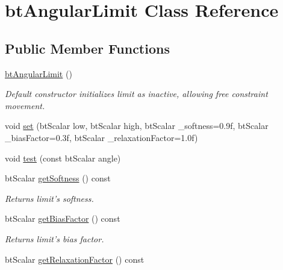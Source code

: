 \hypertarget{classbt_angular_limit}{\section{bt\+Angular\+Limit Class Reference}
\label{classbt_angular_limit}
}
\subsection*{Public Member Functions}
\begin{DoxyCompactItemize}
\item 
\hypertarget{classbt_angular_limit_ac3364359851713e6cb32b16611e9331d}{\hyperlink{classbt_angular_limit_ac3364359851713e6cb32b16611e9331d}{bt\+Angular\+Limit} ()}\label{classbt_angular_limit_ac3364359851713e6cb32b16611e9331d}

\begin{DoxyCompactList}\small\item\em Default constructor initializes limit as inactive, allowing free constraint movement. \end{DoxyCompactList}\item 
void \hyperlink{classbt_angular_limit_aae9e0c21886c2f98f9ad1928bf024b3f}{set} (bt\+Scalar low, bt\+Scalar high, bt\+Scalar \+\_\+softness=0.\+9f, bt\+Scalar \+\_\+bias\+Factor=0.\+3f, bt\+Scalar \+\_\+relaxation\+Factor=1.\+0f)
\item 
void \hyperlink{classbt_angular_limit_aa8908e320fa18257118bbe81948142d8}{test} (const bt\+Scalar angle)
\item 
\hypertarget{classbt_angular_limit_ad1ceabdeec3cfcf85df6e66dd39078de}{bt\+Scalar \hyperlink{classbt_angular_limit_ad1ceabdeec3cfcf85df6e66dd39078de}{get\+Softness} () const }\label{classbt_angular_limit_ad1ceabdeec3cfcf85df6e66dd39078de}

\begin{DoxyCompactList}\small\item\em Returns limit's softness. \end{DoxyCompactList}\item 
\hypertarget{classbt_angular_limit_a01d909bbef9dcface4b6a247ac30c889}{bt\+Scalar \hyperlink{classbt_angular_limit_a01d909bbef9dcface4b6a247ac30c889}{get\+Bias\+Factor} () const }\label{classbt_angular_limit_a01d909bbef9dcface4b6a247ac30c889}

\begin{DoxyCompactList}\small\item\em Returns limit's bias factor. \end{DoxyCompactList}\item 
\hypertarget{classbt_angular_limit_a37a22926d7220924f0baa7fd33ca9404}{bt\+Scalar \hyperlink{classbt_angular_limit_a37a22926d7220924f0baa7fd33ca9404}{get\+Relaxation\+Factor} () const }\label{classbt_angular_limit_a37a22926d7220924f0baa7fd33ca9404}


\end{DoxyCompactItemize}
